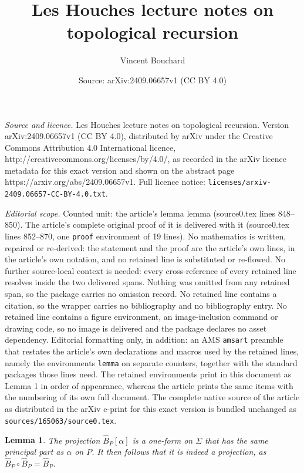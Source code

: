 \documentclass[10pt,a4paper]{amsart}
\title{Les Houches lecture notes on topological recursion}
\author{Vincent Bouchard}
\date{Source: arXiv:2409.06657v1 (CC BY 4.0)}
\newtheorem{lemma}{Lemma}
\begin{document}
\maketitle

\noindent\emph{Source and licence.} Les Houches lecture notes on topological recursion. Version arXiv:2409.06657v1 (CC BY 4.0), distributed by arXiv under the Creative Commons Attribution 4.0 International licence, http://creativecommons.org/licenses/by/4.0/, as recorded in the arXiv licence metadata for this exact version and shown on the abstract page https://arxiv.org/abs/2409.06657v1. Full licence notice: \texttt{licenses/arxiv-2409.06657-CC-BY-4.0.txt}.\par\smallskip

\noindent\textit{Editorial scope.} Counted unit: the article's lemma lemma (source0.tex lines 848--850). The article's complete original proof of it is delivered with it (source0.tex lines 852--870, one \texttt{proof} environment of 19 lines). No mathematics is written, repaired or re-derived: the statement and the proof are the article's own lines, in the article's own notation, and no retained line is substituted or re-flowed.  No further source-local context is needed: every cross-reference of every retained line resolves inside the two delivered spans.  Nothing was omitted from any retained span, so the package carries no omission record.  No retained line contains a citation, so the wrapper carries no bibliography and no bibliography entry.  No retained line contains a figure environment, an image-inclusion command or drawing code, so no image is delivered and the package declares no asset dependency.  Editorial formatting only, in addition: an AMS \texttt{amsart} preamble that restates the article's own declarations and macros used by the retained lines, namely the environments \texttt{lemma} on separate counters, together with the standard packages those lines need.  The retained environments print in this document as Lemma 1 in order of appearance, whereas the article prints the same items with the numbering of its own full document.  The complete native source of the article as distributed in the arXiv e-print for this exact version is bundled unchanged as \texttt{sources/165063/source0.tex}.
\begin{lemma}
The projection $\hat{B}_P[\alpha]$ is a one-form on $\Sigma$ that has the same principal part as $\alpha$ on $P$. It then follows that it is indeed a projection, as $\hat{B}_P \circ \hat{B}_P = \hat{B}_P$.
\end{lemma}
\end{document}
